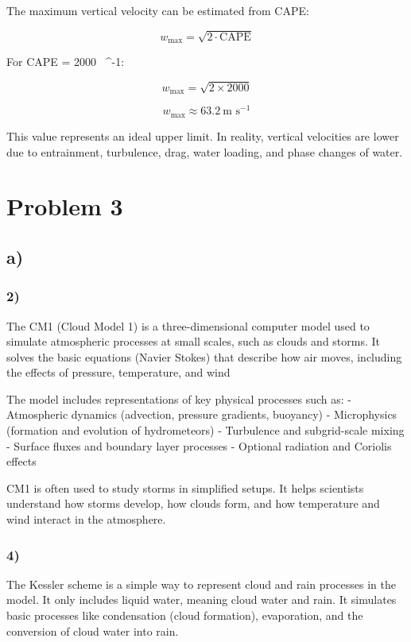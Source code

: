 \documentclass{article}
\begin{document}
The maximum vertical velocity can be estimated from CAPE:

\[
w_{\text{max}} = \sqrt{2 \cdot \text{CAPE}}
\]

For CAPE = 2000 \ ^{-1}:

\[
w_{\text{max}} = \sqrt{2 \times 2000}
\]

\[
w_{\text{max}} \approx 63.2 \ \text{m s}^{-1}
\]

This value represents an ideal upper limit. In reality, vertical velocities are lower due to entrainment, turbulence, drag, water loading, and phase changes of water.


\section{Problem 3}

\subsection*{a)}

\subsubsection*{2)}

The CM1 (Cloud Model 1) is a three-dimensional computer model used to simulate atmospheric processes at small scales, such as clouds and storms. It solves the basic equations (Navier Stokes) that describe how air moves, including the effects of pressure, temperature, and wind

The model includes representations of key physical processes such as:
- Atmospheric dynamics (advection, pressure gradients, buoyancy)
- Microphysics (formation and evolution of hydrometeors)
- Turbulence and subgrid-scale mixing
- Surface fluxes and boundary layer processes
- Optional radiation and Coriolis effects

CM1 is often used to study storms in simplified setups. It helps scientists understand how storms develop, how clouds form, and how temperature and wind interact in the atmosphere.

\subsubsection*{4)}

The Kessler scheme is a simple way to represent cloud and rain processes in the model. It only includes liquid water, meaning cloud water and rain. It simulates basic processes like condensation (cloud formation), evaporation, and the conversion of cloud water into rain.
\end{document}

